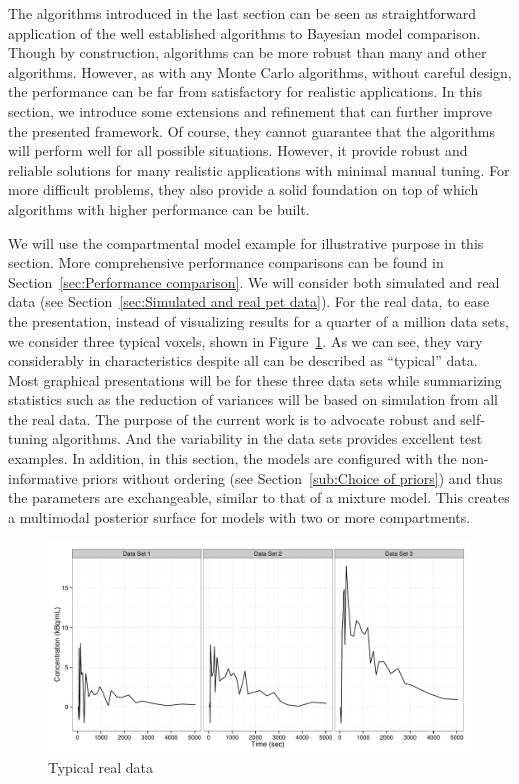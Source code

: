 The algorithms introduced in the last section can be seen as straightforward
application of the well established \smc algorithms to Bayesian model
comparison. Though by construction, \smc algorithms can be more robust than
many \mcmc and other algorithms. However, as with any Monte Carlo algorithms,
without careful design, the performance can be far from satisfactory for
realistic applications. In this section, we introduce some extensions and
refinement that can further improve the presented framework. Of course, they
cannot guarantee that the algorithms will perform well for all possible
situations. However, it provide robust and reliable solutions for many
realistic applications with minimal manual tuning. For more difficult
problems, they also provide a solid foundation on top of which algorithms with
higher performance can be built.

We will use the \pet compartmental model example for illustrative purpose in
this section. More comprehensive performance comparisons can be found in
Section~\ref{sec:Performance comparison}. We will consider both simulated and
real data (see Section~\ref{sec:Simulated and real pet data}). For the real
data, to ease the presentation, instead of visualizing results for a quarter
of a million data sets, we consider three typical voxels, shown in
Figure~\ref{fig:typical real pet}. As we can see, they vary considerably in
characteristics despite all can be described as ``typical'' \pet data. Most
graphical presentations will be for these three data sets while summarizing
statistics such as the reduction of variances will be based on simulation from
all the real data. The purpose of the current work is to advocate robust and
self-tuning algorithms. And the variability in the data sets provides
excellent test examples. In addition, in this section, the models are
configured with the non-informative priors without ordering (see
Section~\ref{sub:Choice of priors}) and thus the parameters are exchangeable,
similar to that of a mixture model. This creates a multimodal posterior
surface for models with two or more compartments.

\begin{figure}[t]
  \includegraphics[width=\linewidth]{fig/Typical_PET}
  \caption{Typical real \protect\pet data}
  \label{fig:typical real pet}
\end{figure}

